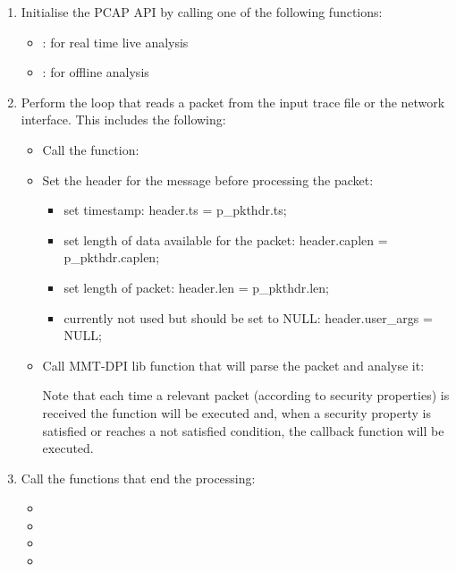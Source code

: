 \begin{enumerate}
\item
Initialise the PCAP API by calling one of the following functions:
\begin{itemize}
\item
{}: for real time live analysis
\item
{}: for offline analysis
\end{itemize}

\item
Perform the loop that reads a packet from the input trace file or the network interface. This includes the following:\begin{itemize}
\item 
    Call the function: 
\item 
    Set the header for the message before processing the packet:

\begin{itemize}
\item
        set timestamp:\newline 
        header.ts = p\_pkthdr.ts;
\item
        set length of data available for the packet:\newline 
        header.caplen = p\_pkthdr.caplen;
\item
        set length of packet:\newline     
        header.len = p\_pkthdr.len;
\item
        currently not used but should be set to NULL:\newline 
        header.user\_args = NULL;
\end{itemize}

\item 
    Call MMT-DPI lib function that will parse the packet and analyse it:
        
    Note that each time a relevant packet (according to security properties) is received the  function will be executed and, when a security property is satisfied or reaches a not satisfied condition, the callback function  will be executed.
\end{itemize}

\item
Call the functions that end the processing:

\begin{itemize}
   \item {}
   \item {}
   \item {}
   \item {}
\end{itemize}

\end{enumerate}


